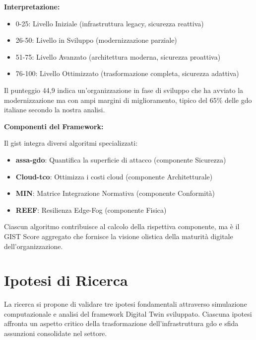 \begin{tcolorbox}
\vspace{0.3cm}
\textbf{Interpretazione:}
\begin{itemize}
    \item 0-25: Livello Iniziale (infrastruttura legacy, sicurezza reattiva)
    \item 26-50: Livello in Sviluppo (modernizzazione parziale)
    \item 51-75: Livello Avanzato (architettura moderna, sicurezza proattiva)
    \item 76-100: Livello Ottimizzato (trasformazione completa, sicurezza adattiva)
\end{itemize}

Il punteggio 44,9 indica un'organizzazione in fase di sviluppo che ha avviato la modernizzazione ma con ampi margini di miglioramento, tipico del 65\% delle \gls{gdo} italiane secondo la nostra analisi.

\vspace{0.3cm}
\textbf{Componenti del Framework:}

Il \gls{gist} integra diversi algoritmi specializzati:
\begin{itemize}
    \item \textbf{\gls{assa-gdo}}: Quantifica la superficie di attacco (componente Sicurezza)
    \item \textbf{Cloud-\gls{tco}}: Ottimizza i costi cloud (componente Architetturale)
    \item \textbf{MIN}: Matrice Integrazione Normativa (componente Conformità)
    \item \textbf{REEF}: Resilienza Edge-Fog (componente Fisica)
\end{itemize}

Ciascun algoritmo contribuisce al calcolo della rispettiva componente, ma è il GIST Score aggregato che fornisce la visione olistica della maturità digitale dell'organizzazione.
\end{tcolorbox}

\section{\texorpdfstring{\textbf{Ipotesi di Ricerca}}{1.4 - Ipotesi di Ricerca}}
\label{sec:ipotesi_ricerca}

La ricerca si propone di validare tre ipotesi fondamentali attraverso simulazione computazionale e analisi del framework Digital Twin sviluppato. Ciascuna ipotesi affronta un aspetto critico della trasformazione dell'infrastruttura \gls{gdo} e sfida assunzioni consolidate nel settore.


